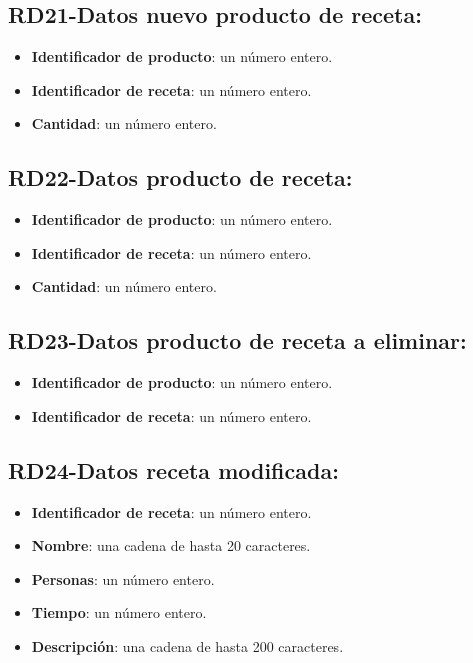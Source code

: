 \documentclass[a4paper,12pt]{report}
\begin{document}
\subsection{RD21-Datos nuevo producto de receta:}
\label{sec-2-1-21}
\begin{itemize}
\item \textbf{Identificador de producto}: un número entero.
\item \textbf{Identificador de receta}: un número entero.
\item \textbf{Cantidad}: un número entero.
\end{itemize}
\subsection{RD22-Datos producto de receta:}
\label{sec-2-1-22}
\begin{itemize}
\item \textbf{Identificador de producto}: un número entero.
\item \textbf{Identificador de receta}: un número entero.
\item \textbf{Cantidad}: un número entero.
\end{itemize}
\subsection{RD23-Datos producto de receta a eliminar:}
\label{sec-2-1-23}
\begin{itemize}
\item \textbf{Identificador de producto}: un número entero.
\item \textbf{Identificador de receta}: un número entero.
\end{itemize}
\subsection{RD24-Datos receta modificada:}
\label{sec-2-1-24}
\begin{itemize}
\item \textbf{Identificador de receta}: un número entero.
\item \textbf{Nombre}: una cadena de hasta 20 caracteres.
\item \textbf{Personas}: un número entero.
\item \textbf{Tiempo}: un número entero.
\item \textbf{Descripción}: una cadena de hasta 200 caracteres.
\end{itemize}
\end{document}
